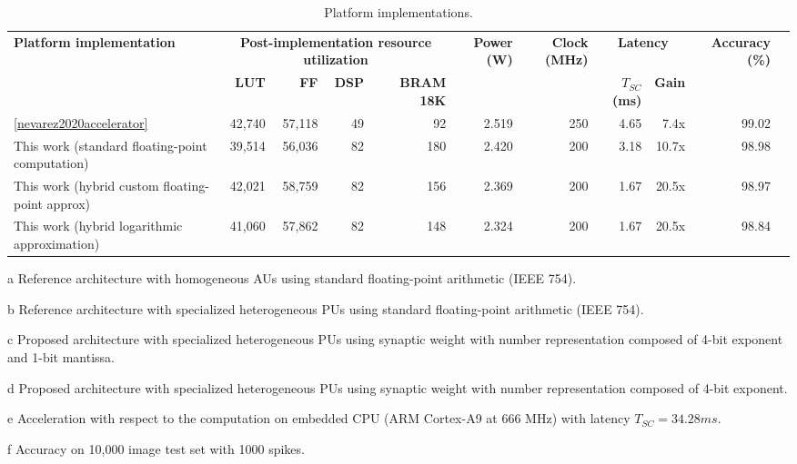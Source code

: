 \begin{table}[!t]
	\begin{threeparttable}
		\centering
		\caption{Platform implementations.}\label{tab:platform_comparison}
		\scriptsize
		\begin{tabular}{lrrrrrrrrrr}\toprule
			\multirow{2}{*}{\textbf{Platform implementation}} &\multicolumn{4}{c}{\textbf{Post-implementation resource utilization}} &\multirow{2}{*}{\textbf{Power (W)}} &\multirow{2}{*}{\textbf{Clock (MHz)}} &\multicolumn{2}{c}{\textbf{Latency}} &\multirow{2}{*}{\textbf{Accuracy (\%)\tnote{f}}} \\\cmidrule{2-5}\cmidrule{8-9}
			&\textbf{LUT} &\textbf{FF} &\textbf{DSP} &\textbf{BRAM 18K} & & &$T_{SC}$ \textbf{(ms)} &\textbf{Gain\tnote{e}} & \\\midrule
			\ref{nevarez2020accelerator}\tnote{a} &42,740 &57,118 &49 &92 &2.519 &250 &4.65 &7.4x &99.02 \\
			This work (standard floating-point computation)\tnote{b} &39,514 &56,036 &82 &180 &2.420 &200 &3.18 &10.7x &98.98 \\
			This work (hybrid custom floating-point approx)\tnote{c} &42,021 &58,759 &82 &156 &2.369 &200 &1.67 &20.5x &98.97 \\
			This work (hybrid logarithmic approximation)\tnote{d} &41,060 &57,862 &82 &148 &2.324 &200 &1.67 &20.5x &98.84 \\
			\bottomrule
		\end{tabular}
		\begin{tablenotes}
			\scriptsize
			\item[a] Reference architecture with homogeneous AUs using standard floating-point arithmetic (IEEE 754).
			\item[b] Reference architecture with specialized heterogeneous PUs using standard floating-point arithmetic (IEEE 754).
			\item[c] Proposed architecture with specialized heterogeneous PUs using synaptic weight with number representation composed of 4-bit exponent and 1-bit mantissa.
			\item[d] Proposed architecture with specialized heterogeneous PUs using synaptic weight with number representation composed of 4-bit exponent.
			\item[e] Acceleration with respect to the computation on embedded CPU (ARM Cortex-A9 at 666 MHz) with latency $T_{SC} = 34.28 ms$.
			\item[f] Accuracy on 10,000 image test set with 1000 spikes.
		\end{tablenotes}
	\end{threeparttable}
\end{table}

